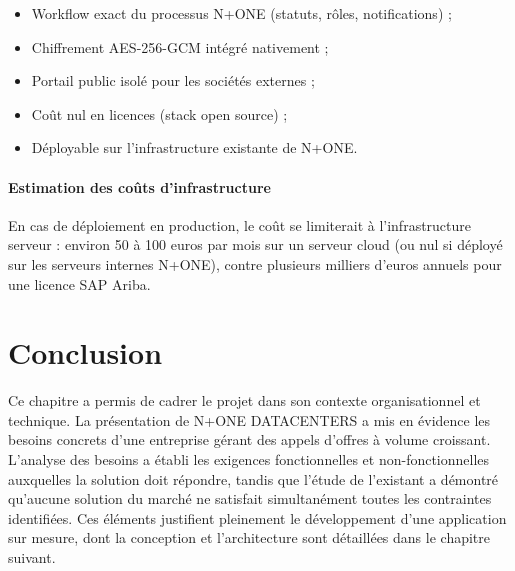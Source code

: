 \begin{itemize}
    \item Workflow exact du processus N+ONE (statuts, rôles, notifications) ;
    \item Chiffrement AES-256-GCM intégré nativement ;
    \item Portail public isolé pour les sociétés externes ;
    \item Coût nul en licences (stack open source) ;
    \item Déployable sur l'infrastructure existante de N+ONE.
\end{itemize}

\paragraph{Estimation des coûts d'infrastructure} En cas de déploiement en production, le coût se limiterait à l'infrastructure serveur : environ 50 à 100 euros par mois sur un serveur cloud (ou nul si déployé sur les serveurs internes N+ONE), contre plusieurs milliers d'euros annuels pour une licence SAP Ariba.

\section{Conclusion}

Ce chapitre a permis de cadrer le projet dans son contexte organisationnel et technique. La présentation de N+ONE DATACENTERS a mis en évidence les besoins concrets d'une entreprise gérant des appels d'offres à volume croissant. L'analyse des besoins a établi les exigences fonctionnelles et non-fonctionnelles auxquelles la solution doit répondre, tandis que l'étude de l'existant a démontré qu'aucune solution du marché ne satisfait simultanément toutes les contraintes identifiées. Ces éléments justifient pleinement le développement d'une application sur mesure, dont la conception et l'architecture sont détaillées dans le chapitre suivant.

\newpage
